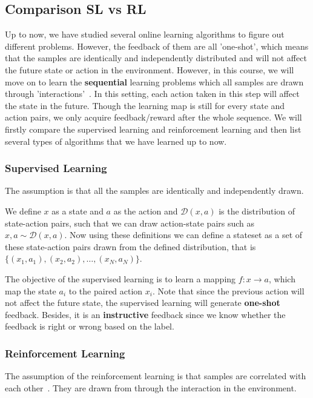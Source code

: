 \documentclass[11pt]{article}
\begin{document}
\subsection{Comparison SL vs RL}
Up to now, we have studied several online learning algorithms to figure out different problems. However, the feedback of them are all 'one-shot', which means that the samples are identically and independently distributed and will not affect the future state or action in the environment. However, in this course, we will move on to learn the \textbf{sequential} learning problems which all samples are drawn through 'interactions'~\cite{kaelbling1996reinforcement}. In this setting, each action taken in this step will affect the state in the future. Though the learning map is still for every state and action pairs, we only acquire feedback/reward after the whole sequence. We will firstly compare the supervised learning and reinforcement learning and then list several types of algorithms that we have learned up to now.



\subsubsection{Supervised Learning}

The assumption is that all the samples are identically and independently drawn.

We define $x$ as a state and $a$ as the action and $\mathcal{D} (x,a)$ is the distribution of state-action pairs, such that we can draw action-state pairs such as $x, a \sim \mathcal{D} (x,a) $.
%
Now using these definitions we can define a stateset as a set of these state-action pairs drawn from the defined distribution, that is $\{ (x_1, a_1), (x_2, a_2), \dots, (x_N, a_N) \}$.

The objective of the supervised learning is to learn a mapping $f: x\rightarrow a$, which map the state $a_i$ to the paired action $x_i$. Note that since the previous action will not affect the future state, the supervised learning will generate \textbf{one-shot} feedback. Besides, it is an \textbf{instructive} feedback since we know whether the feedback is right or wrong based on the label.

\subsubsection{Reinforcement Learning}

The assumption of the reinforcement learning is that samples are correlated with each other~\cite{sutton2018reinforcement}. They are drawn from through the interaction in the environment.
\end{document}
